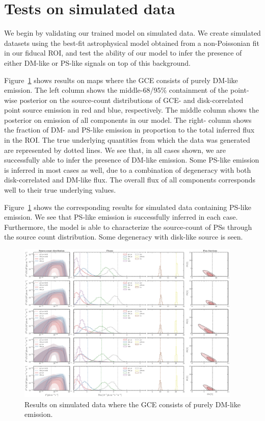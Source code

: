 \documentclass[prd,aps,10pt,nofootinbib,twocolumn,superscriptaddress,preprintnumbers,balancelastpage,longbibliography]{revtex4-1}
\begin{document}
\section{Tests on simulated data}
\label{sec:simulations}

We begin by validating our trained model on simulated data. We create simulated datasets using the best-fit astrophysical model obtained from a non-Poissonian fit in our fiducal ROI, and test the ability of our model to infer the presence of either DM-like or PS-like signals on top of this background.

Figure~\ref{fig:sim_sbi_dm} shows results on maps where the GCE consists of purely DM-like emission. The left column shows the middle-68/95\% containment of the point-wise posterior on the source-count distributions of GCE- and disk-correlated point source emission in red and blue, respectively. The middle column shows the posterior on emission of all components in our model. The right- column shows the fraction of DM- and PS-like emission in proportion to the total inferred flux in the ROI. The true underlying quantities from which the data was generated are represented by dotted lines. We see that, in all cases shown, we are successfully able to infer the presence of DM-like emission. Some PS-like emission is inferred in most cases as well, due to a combination of degeneracy with both disk-correlated and DM-like flux. The overall flux of all components corresponds well to their true underlying values.

Figure~\ref{fig:sim_sbi_dm} shows the corresponding results for simulated data containing PS-like emission. We see that PS-like emission is successfully inferred in each case. Furthermore, the model is able to characterize the source-count of PSs through the source count distribution. Some degeneracy with disk-like source is seen.

%
\begin{figure}
    \centering
    \includegraphics[width=0.95\textwidth]{plots/sim_sbi_dm.pdf}
    \caption{Results on simulated data where the GCE consists of purely DM-like emission.}
    \label{fig:sim_sbi_dm}
\end{figure}
%
\end{document}

